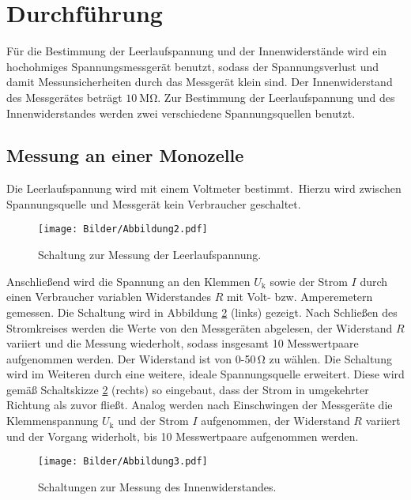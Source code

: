 \section{Durchführung}
\label{sec:Durchfuehrung}
Für die Bestimmung der Leerlaufspannung und der Innenwiderstände wird ein hochohmiges Spannungsmessgerät benutzt, sodass der Spannungsverlust und damit Messunsicherheiten durch das Messgerät klein sind.
Der Innenwiderstand des Messgerätes beträgt $\SI{10}{\mega\ohm}$.
Zur Bestimmung der Leerlaufspannung und des Innenwiderstandes werden zwei verschiedene Spannungsquellen benutzt.

\subsection{Messung an einer Monozelle}
\label{sec:drchf_monozelle}
Die Leerlaufspannung wird mit einem Voltmeter bestimmt.\
Hierzu wird zwischen Spannungsquelle und Messgerät kein Verbraucher geschaltet.
\begin{figure}
	\centering
	\texttt{[image: Bilder/Abbildung2.pdf]}
	\caption{Schaltung zur Messung der Leerlaufspannung.\cite{V301}}
	\label{fig:leerlauf}
\end{figure}

Anschließend wird die Spannung an den Klemmen $U_\text{k}$ sowie der Strom $I$ durch einen Verbraucher variablen Widerstandes $R$ mit Volt- bzw. Amperemetern gemessen.
Die Schaltung wird in Abbildung \ref{fig:ri} (links) gezeigt.
Nach Schließen des Stromkreises werden die Werte von den Messgeräten abgelesen, der Widerstand $R$ variiert und die Messung wiederholt, sodass insgesamt 10 Messwertpaare aufgenommen werden.
Der Widerstand ist von 0-50\,\si{\ohm} zu wählen.
Die Schaltung wird im Weiteren durch eine weitere, ideale Spannungsquelle erweitert.
Diese wird gemäß Schaltskizze \ref{fig:ri} (rechts) so eingebaut, dass der Strom in umgekehrter Richtung als zuvor fließt.
Analog werden nach Einschwingen der Messgeräte die Klemmenspannung $U_\text{k}$ und der Strom $I$ aufgenommen, der Widerstand $R$ variiert und der Vorgang widerholt, bis 10 Messwertpaare aufgenommen werden.
\begin{figure}
	\centering
	\texttt{[image: Bilder/Abbildung3.pdf]}
	\caption{Schaltungen zur Messung des Innenwiderstandes.\cite{V301}}
\label{fig:ri}
\end{figure}

